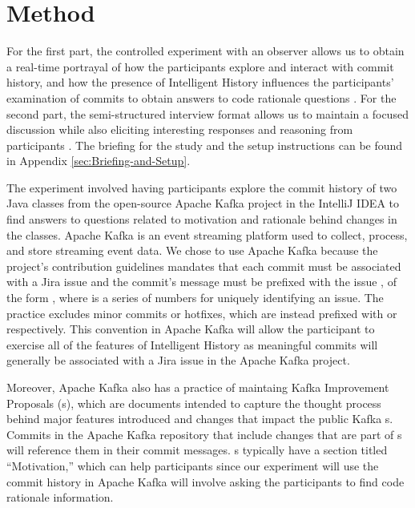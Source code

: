 \section{Method}
\label{sec:Method}

For the first part, the controlled experiment with an observer allows us to obtain a real-time 
portrayal of how the participants explore and interact with commit history,
and how the presence of Intelligent History influences the participants'
examination of commits to obtain answers to code rationale questions \cite{shull_guide_2007}.
For the second part, the semi-structured interview format allows us to maintain a focused discussion 
while also eliciting interesting responses and reasoning from participants \cite{shull_guide_2007}.
The briefing for the study and the setup instructions can be found in Appendix \ref{sec:Briefing-and-Setup}.

The experiment involved having participants explore the commit history of two Java classes 
from the open-source Apache Kafka project in the IntelliJ IDEA  
to find answers to questions related to motivation and rationale behind changes in the classes.
Apache Kafka is an event streaming platform used to collect, process, and store streaming event data.
We chose to use Apache Kafka because the project's contribution guidelines mandates that
each commit must be associated with a Jira issue and the commit's message 
must be prefixed with the issue , of the form , 
where  is a series of numbers for uniquely identifying an issue.
The practice excludes minor commits or hotfixes, 
which are instead prefixed with  or  respectively.
This convention in Apache Kafka will allow the participant to exercise all of the features of Intelligent History
as meaningful commits will generally be associated with a Jira issue in the Apache Kafka project.

Moreover, Apache Kafka also has a practice of maintaing Kafka Improvement Proposals (s),
which are documents intended to capture the thought process behind major features introduced 
and changes that impact the public Kafka s.
Commits in the Apache Kafka repository that include changes that are part of s will
reference them in their commit messages.
s typically have a section titled ``Motivation,''
which can help participants since our experiment will use the commit history 
in Apache Kafka will involve asking the participants to find code rationale information.

